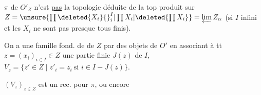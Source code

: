 $\pi$ de $O'_Z$ n'est \uline{pas} la topologie déduite de la top produit sur $Z=\unsure{\prod\deleted{X_i}{}^I_i|\prod X_i|\deleted{\prod X_i}}=\varprojlim Z_\alpha$ (si $I$ infini et les $X_i$ ne sont pas presque tous finis).

 On a une famille fond. de   de $Z$ par des objets de $O'$ en associant à tt $z=(x_i)_{i\in I}\in Z$ une partie finie $J(z)$ de $I$,     $V_z=\{z'\in Z\mid z'_i=z_i\ \text{si }i\in I-J(z)\}$.


 $(V_z)_{z\in Z}$ est  un rec. pour $\pi$, ou encore

